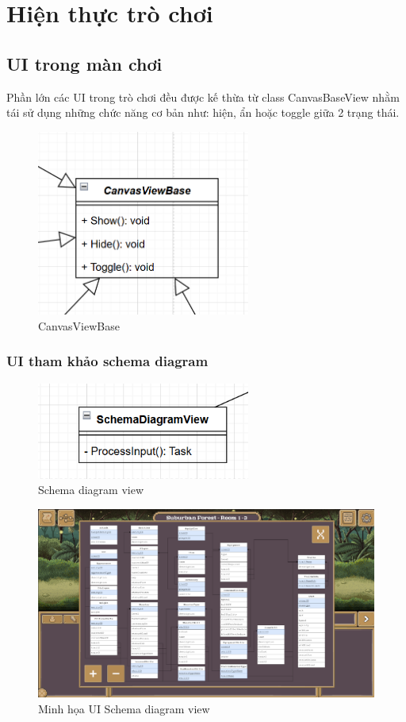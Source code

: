 \section{Hiện thực trò chơi}
\subsection{UI trong màn chơi}
Phần lớn các UI trong trò chơi đều được kế thừa từ class CanvasBaseView nhằm tái sử dụng những chức năng cơ bản như: hiện, ẩn hoặc toggle giữa 2 trạng thái.
\begin{figure}[H]
	\centering
	\includegraphics[width=7cm]{Images/CanvasViewBase.png}
	\vspace{0.5cm}
	\caption{CanvasViewBase}
\end{figure}

\subsubsection{UI tham khảo schema diagram}
\begin{figure}[H]
	\centering
	\includegraphics[width=7cm]{Images/SchemaDiagramView.png}
	\vspace{0.5cm}
	\caption{Schema diagram view}
\end{figure}

\begin{figure}[H]
	\centering
	\includegraphics[width=13cm]{Images/SchemaDiagramUi.png}
	\vspace{0.5cm}
	\caption{Minh họa UI Schema diagram view}
\end{figure}

